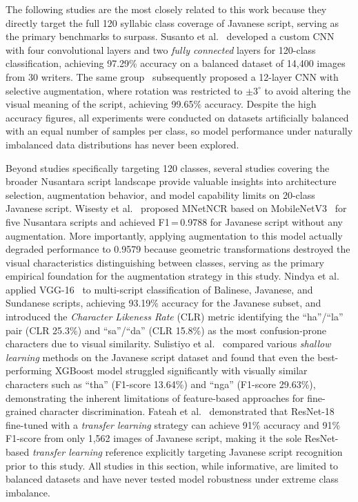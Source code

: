 \documentclass[conference]{IEEEtran}
\begin{document}
The following studies are the most closely related to this work
because they directly target the full 120 syllabic class coverage
of Javanese script, serving as the primary benchmarks to surpass.
Susanto et al.~\cite{susantoIJECE2023} developed a custom CNN with
four convolutional layers and two \textit{fully connected} layers for
120-class classification, achieving 97.29\% accuracy on a balanced
dataset of 14,400 images from 30 writers.
The same group~\cite{susantoIJAI2023} subsequently proposed a
12-layer CNN with selective augmentation, where rotation was restricted
to $\pm3^{\circ}$ to avoid altering the visual meaning of the script,
achieving 99.65\% accuracy.
Despite the high accuracy figures, all experiments were conducted on
datasets artificially balanced with an equal number of samples per
class, so model performance under naturally imbalanced data
distributions has never been explored.

Beyond studies specifically targeting 120 classes, several studies
covering the broader Nusantara script landscape provide valuable
insights into architecture selection, augmentation behavior, and model
capability limits on 20-class Javanese script.
Wisesty et al.~\cite{wisesty2026} proposed MNetNCR based on
MobileNetV3~\cite{howard2019mobilenetv3} for five Nusantara scripts
and achieved F1\,=\,0.9788 for Javanese script without any augmentation.
More importantly, applying augmentation to this model actually
degraded performance to 0.9579 because geometric transformations
destroyed the visual characteristics distinguishing between classes,
serving as the primary empirical foundation for the
augmentation strategy in this study.
Nindya et al.~\cite{nindya2025} applied VGG-16~\cite{simonyan2015vgg}
to multi-script classification of Balinese, Javanese, and Sundanese
scripts, achieving 93.19\% accuracy for the Javanese subset, and
introduced the \textit{Character Likeness Rate} (CLR) metric
identifying the ``ha''/``la'' pair (CLR 25.3\%) and ``sa''/``da''
(CLR 15.8\%) as the most confusion-prone characters due to
visual similarity.
Sulistiyo et al.~\cite{sulistiyo2025} compared various
\textit{shallow learning} methods on the Javanese script dataset and
found that even the best-performing XGBoost model struggled
significantly with visually similar characters such as ``tha''
(F1-score 13.64\%) and ``nga'' (F1-score 29.63\%), demonstrating
the inherent limitations of feature-based approaches for
fine-grained character discrimination.
Fateah et al.~\cite{ifriza2026} demonstrated that ResNet-18~%
\cite{he2016resnet} fine-tuned with a \textit{transfer learning}
strategy can achieve 91\% accuracy and 91\% F1-score from only
1,562 images of Javanese script, making it the sole ResNet-based \textit{transfer learning}
reference explicitly targeting Javanese script recognition
prior to this study.
All studies in this section, while informative, are limited to
balanced datasets and have never tested model robustness under
extreme class imbalance.
\end{document}
